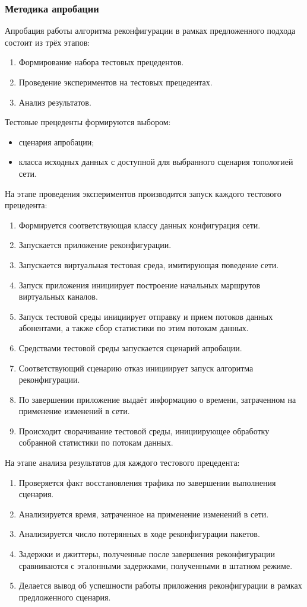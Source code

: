 \documentclass[12pt, a4paper]{article}
\begin{document}
\subsubsection{Методика апробации}
Апробация работы алгоритма реконфигурации в рамках предложенного подхода состоит из трёх этапов:
\begin{enumerate}
	\item Формирование набора тестовых прецедентов.
	\item Проведение экспериментов на тестовых прецедентах.
	\item Анализ результатов.
\end{enumerate}

Тестовые прецеденты формируются выбором:
\begin{itemize}
	\item сценария апробации;
	\item класса исходных данных с доступной для выбранного сценария топологией сети.
\end{itemize}

На этапе проведения экспериментов производится запуск каждого тестового прецедента:
\begin{enumerate}
	\item Формируется соответствующая классу данных конфигурация сети.
	\item Запускается приложение реконфигурации.
	\item Запускается виртуальная тестовая среда, имитирующая поведение сети.
	\item Запуск приложения инициирует построение начальных маршрутов виртуальных каналов.
	\item Запуск тестовой среды инициирует отправку и прием потоков данных абонентами, а также сбор статистики по этим потокам данных.
	\item Средствами тестовой среды запускается сценарий апробации.
	\item Соответствующий сценарию отказ инициирует запуск алгоритма реконфигурации.
	\item По завершении приложение выдаёт информацию о времени, затраченном на применение изменений в сети.
	\item Происходит сворачивание тестовой среды, инициирующее обработку собранной статистики по потокам данных.
\end{enumerate}

На этапе анализа результатов для каждого тестового прецедента:
\begin{enumerate}
	\item Проверяется факт восстановления трафика по завершении выполнения сценария.
	\item Анализируется время, затраченное на применение изменений в сети.
	\item Анализируется число потерянных в ходе реконфигурации пакетов.
	\item Задержки и джиттеры, полученные после завершения реконфигурации сравниваются с эталонными задержками, полученными в штатном режиме.
	\item Делается вывод об успешности работы приложения реконфигурации в рамках предложенного сценария.
\end{enumerate}
\end{document}
